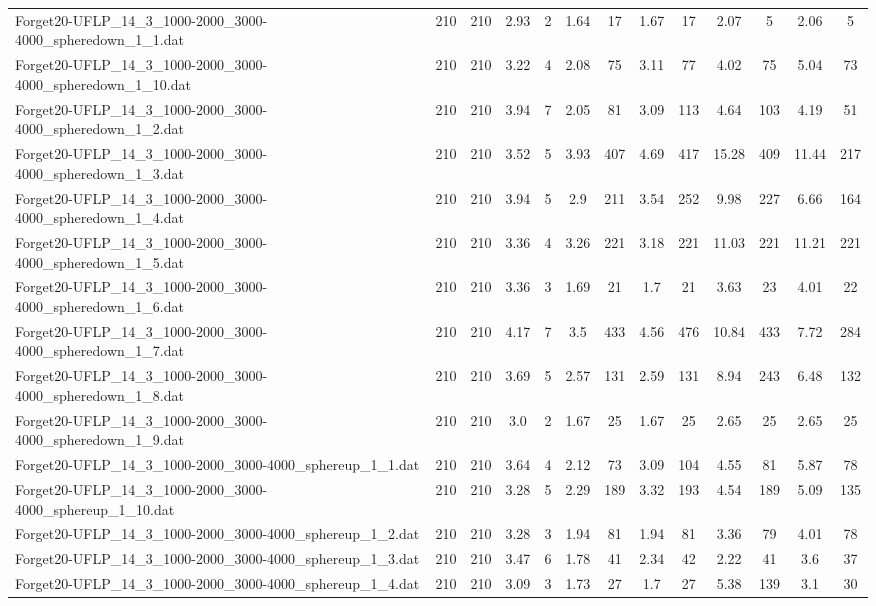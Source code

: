\begin{table}[!ht]
{\begin{tabular}{lcccccccccccc}
Forget20-UFLP\_14\_3\_1000-2000\_3000-4000\_spheredown\_1\_1.dat & 210 & 210 & 2.93 & 2 & 1.64 & 17 & 1.67 & 17 & 2.07 & 5 & 2.06 & 5 \\
Forget20-UFLP\_14\_3\_1000-2000\_3000-4000\_spheredown\_1\_10.dat & 210 & 210 & 3.22 & 4 & 2.08 & 75 & 3.11 & 77 & 4.02 & 75 & 5.04 & 73 \\
Forget20-UFLP\_14\_3\_1000-2000\_3000-4000\_spheredown\_1\_2.dat & 210 & 210 & 3.94 & 7 & 2.05 & 81 & 3.09 & 113 & 4.64 & 103 & 4.19 & 51 \\
Forget20-UFLP\_14\_3\_1000-2000\_3000-4000\_spheredown\_1\_3.dat & 210 & 210 & 3.52 & 5 & 3.93 & 407 & 4.69 & 417 & 15.28 & 409 & 11.44 & 217 \\
Forget20-UFLP\_14\_3\_1000-2000\_3000-4000\_spheredown\_1\_4.dat & 210 & 210 & 3.94 & 5 & 2.9 & 211 & 3.54 & 252 & 9.98 & 227 & 6.66 & 164 \\
Forget20-UFLP\_14\_3\_1000-2000\_3000-4000\_spheredown\_1\_5.dat & 210 & 210 & 3.36 & 4 & 3.26 & 221 & 3.18 & 221 & 11.03 & 221 & 11.21 & 221 \\
Forget20-UFLP\_14\_3\_1000-2000\_3000-4000\_spheredown\_1\_6.dat & 210 & 210 & 3.36 & 3 & 1.69 & 21 & 1.7 & 21 & 3.63 & 23 & 4.01 & 22 \\
Forget20-UFLP\_14\_3\_1000-2000\_3000-4000\_spheredown\_1\_7.dat & 210 & 210 & 4.17 & 7 & 3.5 & 433 & 4.56 & 476 & 10.84 & 433 & 7.72 & 284 \\
Forget20-UFLP\_14\_3\_1000-2000\_3000-4000\_spheredown\_1\_8.dat & 210 & 210 & 3.69 & 5 & 2.57 & 131 & 2.59 & 131 & 8.94 & 243 & 6.48 & 132 \\
Forget20-UFLP\_14\_3\_1000-2000\_3000-4000\_spheredown\_1\_9.dat & 210 & 210 & 3.0 & 2 & 1.67 & 25 & 1.67 & 25 & 2.65 & 25 & 2.65 & 25 \\
Forget20-UFLP\_14\_3\_1000-2000\_3000-4000\_sphereup\_1\_1.dat & 210 & 210 & 3.64 & 4 & 2.12 & 73 & 3.09 & 104 & 4.55 & 81 & 5.87 & 78 \\
Forget20-UFLP\_14\_3\_1000-2000\_3000-4000\_sphereup\_1\_10.dat & 210 & 210 & 3.28 & 5 & 2.29 & 189 & 3.32 & 193 & 4.54 & 189 & 5.09 & 135 \\
Forget20-UFLP\_14\_3\_1000-2000\_3000-4000\_sphereup\_1\_2.dat & 210 & 210 & 3.28 & 3 & 1.94 & 81 & 1.94 & 81 & 3.36 & 79 & 4.01 & 78 \\
Forget20-UFLP\_14\_3\_1000-2000\_3000-4000\_sphereup\_1\_3.dat & 210 & 210 & 3.47 & 6 & 1.78 & 41 & 2.34 & 42 & 2.22 & 41 & 3.6 & 37 \\
Forget20-UFLP\_14\_3\_1000-2000\_3000-4000\_sphereup\_1\_4.dat & 210 & 210 & 3.09 & 3 & 1.73 & 27 & 1.7 & 27 & 5.38 & 139 & 3.1 & 30 \\

\end{tabular}}
\end{table}
